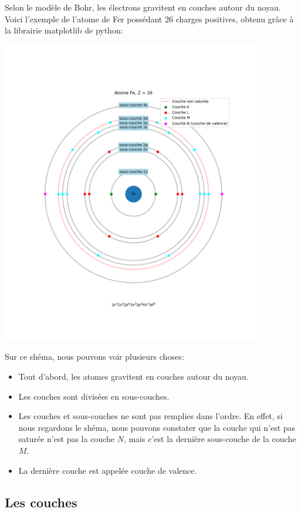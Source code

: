 \documentclass[
]{report}
\providecommand{\tightlist}{%
  \setlength{\itemsep}{0pt}\setlength{\parskip}{0pt}}\usepackage{longtable,booktabs,array}
\begin{document}
Selon le modèle de Bohr, les électrons gravitent en couches autour du
noyau. Voici l'exemple de l'atome de Fer possédant 26 charges positives,
obtenu grâce à la librairie matplotlib de python:

\center \includegraphics[width=0.85\textwidth,height=\textheight]{./images/physique/Fe.png}

\raggedright

Sur ce shéma, nous pouvons voir plusieurs choses:

\begin{itemize}
\tightlist
\item
  Tout d'abord, les atomes gravitent en couches autour du noyau.
\item
  Les couches sont divisées en sous-couches.
\item
  Les couches et sous-couches ne sont pas remplies dans l'ordre. En
  effet, si nous regardons le shéma, nous pouvons constater que la
  couche qui n'est pas saturée n'est pas la couche \(N\), mais c'est la
  dernière sous-couche de la couche \(M\).
\item
  La dernière couche est appelée couche de valence.
\end{itemize}

\subsection{Les couches}\label{les-couches}
\end{document}
